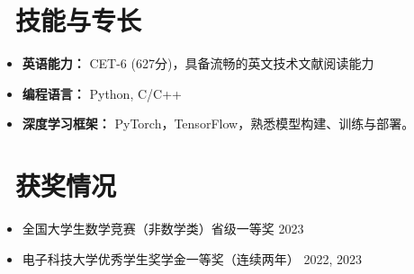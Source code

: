 \documentclass[11pt]{article}
\begin{document}
\section{\makebox[\widthof{\faCogs}][c]{\color{CVBlue}\faCogs}\ 技能与专长}
\begin{itemize}[nosep]
\item \textbf{英语能力：} CET-6 (627分)，具备流畅的英文技术文献阅读能力
\item \textbf{编程语言：} Python, C/C++
\item \textbf{深度学习框架：} PyTorch，TensorFlow，熟悉模型构建、训练与部署。
\end{itemize}
\section{\makebox[\widthof{\faGraduationCap}][c]{\color{CVBlue}\faList}\ 获奖情况}
\begin{itemize}[nosep]
\item 全国大学生数学竞赛（非数学类）省级一等奖 \hfill 2023
\item 电子科技大学优秀学生奖学金一等奖（连续两年） \hfill 2022, 2023
\end{itemize}
\end{document}
